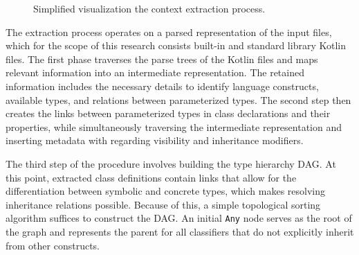\begin{figure}[!hbtp]
\begin{minipage}[t]{-4\linewidth}
\end{minipage}
\vspace{3.5cm}
\caption{Simplified visualization the context extraction process.}
\label{fig:context-extraction}
\end{figure}

The extraction process operates on a parsed representation of the input
files, which for the scope of this research consists built-in and standard library 
Kotlin files.
The first phase traverses the parse trees of the Kotlin files and maps
relevant information into an intermediate representation.
The retained information includes the necessary details to identify language constructs,
available types, and relations between parameterized types.
The second step then creates the links between 
parameterized types in class declarations and their properties, while simultaneously
traversing the intermediate representation and inserting metadata with regarding
visibility and inheritance modifiers.

The third step of the procedure involves building the type hierarchy \Gls{DAG}.
At this point, extracted class definitions contain links that allow for the
differentiation between symbolic and concrete types, which makes resolving
inheritance relations possible.
Because of this, a simple topological sorting algorithm suffices to construct the \Gls{DAG}.
An initial \texttt{Any} node serves as the root of the graph
and represents the parent for all classifiers
that do not explicitly inherit from other constructs.


